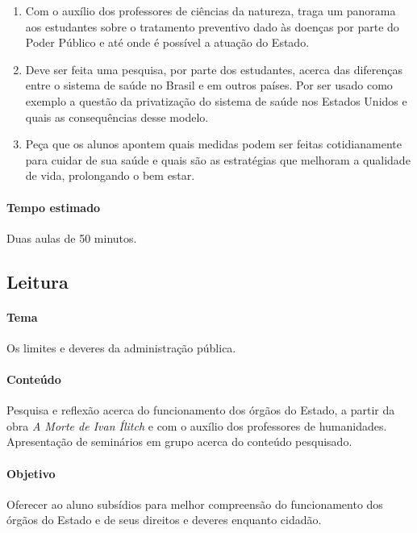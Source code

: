 \documentclass[12pt]{extarticle}
\begin{document}
\begin{enumerate}

\item Com o auxílio dos professores de ciências da natureza, traga
um panorama aos estudantes sobre o tratamento preventivo dado às doenças
por parte do Poder Público e até onde é possível a atuação do Estado.

\item Deve ser feita uma pesquisa, por parte dos estudantes,
acerca das diferenças entre o sistema de saúde no Brasil e em outros países.
Por ser usado como exemplo a questão da privatização do sistema de saúde nos Estados Unidos
e quais as consequências desse modelo.

\item Peça que os alunos apontem quais medidas podem ser feitas cotidianamente
para cuidar de sua saúde e quais são as estratégias que melhoram a qualidade de vida, 
prolongando o bem estar.

\end{enumerate}

\paragraph{Tempo estimado} Duas aulas de 50 minutos.


\subsection{Leitura}

\paragraph{Tema} Os limites e deveres da administração pública.

\paragraph{Conteúdo} Pesquisa e reflexão acerca do funcionamento dos órgãos do Estado,
a partir da obra \emph{A Morte de Ivan Ílitch} e com o auxílio dos professores
de humanidades. Apresentação de seminários em grupo acerca do conteúdo pesquisado.

\paragraph{Objetivo} Oferecer ao aluno subsídios para melhor compreensão do
funcionamento dos órgãos do Estado e de seus direitos e deveres enquanto cidadão.
\end{document}
